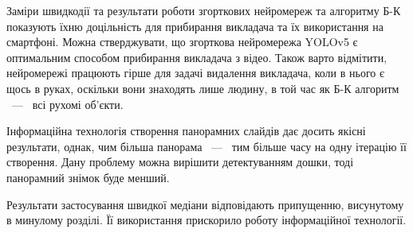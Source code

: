 \chapterConclusion

Заміри швидкодії та результати роботи згорткових нейромереж та алгоритму Б-К показують
їхню доцільність для прибирання викладача та їх використання на смартфоні. 
Можна стверджувати, що згорткова нейромережа YOLOv5 є оптимальним способом
прибирання викладача з відео. Також варто відмітити, нейромережі 
працюють гірше для задачі видалення викладача, коли в нього є щось в руках, 
оскільки вони знаходять лише людину, в той час як Б-К алгоритм ~---~ всі рухомі об'єкти.


Інформаційна технологія створення панорамних слайдів дає досить якісні результати, 
однак, чим більша панорама ~---~ тим більше часу на одну ітерацію її створення. Дану проблему можна вирішити 
детектуванням дошки, тоді панорамний знімок буде менший. 

Результати застосування швидкої медіани відповідають припущенню, висунутому в минулому розділі.
Її використання прискорило роботу інформаційної технології. 
